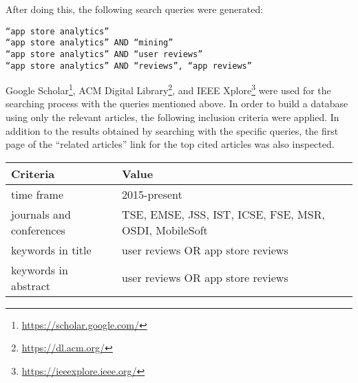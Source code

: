 \documentclass[]{book}
\let\rmarkdownfootnote\footnote%
\def\footnote{\protect\rmarkdownfootnote}
\begin{document}
After doing this, the following search queries were generated:

\begin{verbatim}
“app store analytics” 
“app store analytics” AND “mining” 
“app store analytics” AND “user reviews” 
“app store analytics” AND “reviews”, “app reviews”
\end{verbatim}

Google Scholar\footnote{\url{https://scholar.google.com/}}, ACM Digital
Library\footnote{\url{https://dl.acm.org/}}, and IEEE Xplore\footnote{\url{https://ieeexplore.ieee.org/}}
were used for the searching process with the queries mentioned above. In
order to build a database using only the relevant articles, the
following inclusion criteria were applied. In addition to the results
obtained by searching with the specific queries, the first page of the
``related articles'' link for the top cited articles was also inspected.

\begin{longtable}[]{@{}ll@{}}
\toprule
\begin{minipage}[b]{0.22\columnwidth}\raggedright\strut
Criteria\strut
\end{minipage} & \begin{minipage}[b]{0.18\columnwidth}\raggedright\strut
Value\strut
\end{minipage}\tabularnewline
\midrule
\endhead
\begin{minipage}[t]{0.22\columnwidth}\raggedright\strut
time frame\strut
\end{minipage} & \begin{minipage}[t]{0.18\columnwidth}\raggedright\strut
2015-present\strut
\end{minipage}\tabularnewline
\begin{minipage}[t]{0.22\columnwidth}\raggedright\strut
journals and conferences\strut
\end{minipage} & \begin{minipage}[t]{0.18\columnwidth}\raggedright\strut
TSE, EMSE, JSS, IST, ICSE, FSE, MSR, OSDI, MobileSoft\strut
\end{minipage}\tabularnewline
\begin{minipage}[t]{0.22\columnwidth}\raggedright\strut
keywords in title\strut
\end{minipage} & \begin{minipage}[t]{0.18\columnwidth}\raggedright\strut
user reviews OR app store reviews\strut
\end{minipage}\tabularnewline
\begin{minipage}[t]{0.22\columnwidth}\raggedright\strut
keywords in abstract\strut
\end{minipage} & \begin{minipage}[t]{0.18\columnwidth}\raggedright\strut
user reviews OR app store reviews\strut
\end{minipage}\tabularnewline
\bottomrule
\end{longtable}
\end{document}
